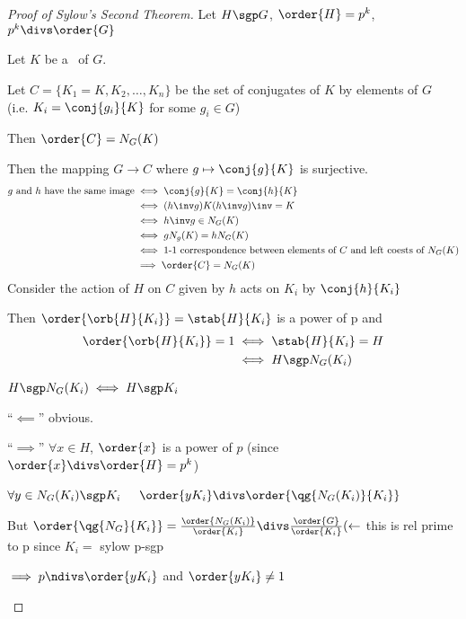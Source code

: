 \begin{proof}[Proof of Sylow's Second Theorem]
    Let \(H\sgp G\), \(\order{H}=p^k\), \(p^k\divs\order{G}\)

    Let \(K\) be a \spsgp\ of \(G\).

    Let \(C=\{K_1=K, K_2,\ldots,K_n\}\) be the set of conjugates of \(K\) by elements of \(G\)\\
    (i.e. \(K_i=\conj{g_i}{K}\) for some \(g_i\in G\))

    Then \(\order{C}=\index{G}{N_G(K)}\)

    Then the mapping \(G\to C\) where \(g\mapsto \conj{g}{K}\) is surjective.
    \begin{align*}
        \text{\(g\) and \(h\) have the same image} &\iff \conj{g}{K}=\conj{h}{K} \\
        &\iff (h\inv g)K(h\inv g)\inv = K \\
        &\iff h\inv g\in N_G(K) \\
        &\iff gN_g(K)=hN_G(K) \\
        &\iff \text{1-1 correspondence between elements of \(C\) and left coests of \(N_G(K)\)} \\
        &\implies \order{C}=\index{G}{N_G(K)}
    \end{align*}
    Consider the action of \(H\) on \(C\) given by \(h\) acts on \(K_i\) by \(\conj{h}{K_i}\)

    Then \(\order{\orb{H}{K_i}} = \index{H}{\stab{H}{K_i}}\) is a power of p and
    \begin{align*}
        \order{\orb{H}{K_i}}=1 &\iff \stab{H}{K_i}=H\\
        &\iff H\sgp N_G(K_i)
    \end{align*}
    \begin{claim}
        \(H\sgp N_G(K_i)\iff H\sgp K_i\)
    \end{claim}
    \begin{subproof}
        ``\(\impliedby\)''  obvious.

        ``\(\implies\)'' \(\forall x\in H\), \(\order{x}\) is a power of \(p\) (since \(\order{x}\divs\order{H}=p^k\))

        \(\forall y\in N_G(K_i)\sgp K_i\) \(\quad \order{yK_i}\divs\order{\qg{N_G(K_i)}{K_i}}\)

        But \(\order{\qg{N_G}{K_i}} = \frac{\order{N_G(K_i)}}{\order{K_i}}\divs\frac{\order{G}}{\order{K_i}} (\leftarrow\) this is rel prime to p since \(K_i=\) sylow p-sgp

        \(\implies p\ndivs \order{yK_i}\) and \(\order{yK_i}\neq 1\)


\end{subproof}
\end{proof}
